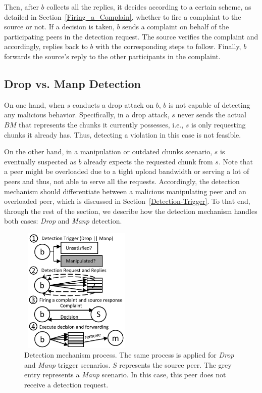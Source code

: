Then, after $b$ collects all the replies, it decides according to a certain scheme, as detailed in Section~\ref{Firing_a_Complain}, whether to fire a complaint to the source or not.
If a decision is taken, $b$ sends a complaint on behalf of the participating peers in the detection request. 
The source verifies the complaint and accordingly, replies back to $b$ with the corresponding steps to follow. 
Finally, $b$ forwards the source's reply to the other participants in the complaint.

\subsection{Drop vs. Manp Detection}

On one hand, when $s$ conducts a drop attack on $b$, $b$ is not capable of detecting any malicious behavior.
Specifically, in a drop attack, $s$ never sends the actual $BM$ that represents the chunks it currently possesses, i.e., $s$ is only requesting chunks it already has.
Thus, detecting a violation in this case is not feasible.

On the other hand, in a manipulation or outdated chunks scenario, $s$ is eventually suspected as $b$ already expects the requested chunk from $s$.
Note that a peer might be overloaded due to a tight upload bandwidth or serving a lot of peers and thus, not able to serve all the requests.
Accordingly, the detection mechanism should differentiate between a malicious manipulating peer and an overloaded peer, which is discussed in Section~\ref{Detection-Trigger}.
To that end, through the rest of the section, we describe how the detection mechanism handles both cases: \textit{Drop} and \textit{Manp} detection.

\begin{figure}
 \centering
 \includegraphics[width=5.5cm,height=6cm]{./Figures/detection.pdf}
  \caption{Detection mechanism process. The same process is applied for \textit{Drop} and \textit{Manp} trigger scenarios. $S$ represents the source peer. The grey entry represents a \textit{Manp} scenario. In this case, this peer does not receive a detection request.}
\label{detection-blocks} 
\end{figure}

